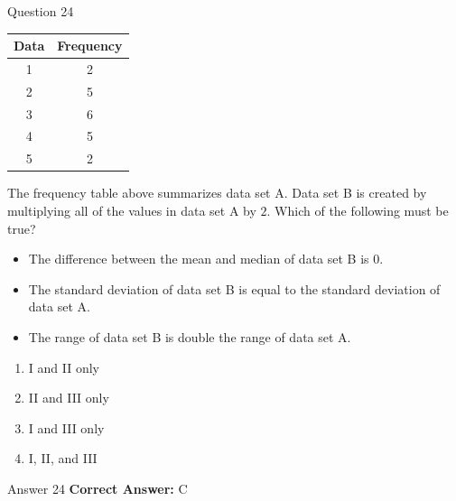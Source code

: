 \documentclass{beamer}
\begin{document}
\begin{frame}{Question 24}
\small
\begin{center}
\begin{tabular}{|c|c|}
\hline
\textbf{Data} & \textbf{Frequency}\\
\hline
1 & 2\\
2 & 5\\
3 & 6\\
4 & 5\\
5 & 2\\
\hline
\end{tabular}
\end{center}

The frequency table above summarizes data set A. 
Data set B is created by multiplying all of the values in data set A by $2$. 
Which of the following must be true?

\begin{itemize}
\item[I.] The difference between the mean and median of data set B is $0$.
\item[II.] The standard deviation of data set B is equal to the standard deviation of data set A.
\item[III.] The range of data set B is double the range of data set A.
\end{itemize}
\vspace{0.35cm}
\begin{enumerate}
    \item[A.] I and II only
    \item[B.] II and III only
    \item[C.] I and III only
    \item[D.] I, II, and III
\end{enumerate}
\end{frame}
\begin{frame}{Answer 24}
\small
\textbf{Correct Answer:} C
\end{frame}
\end{document}
